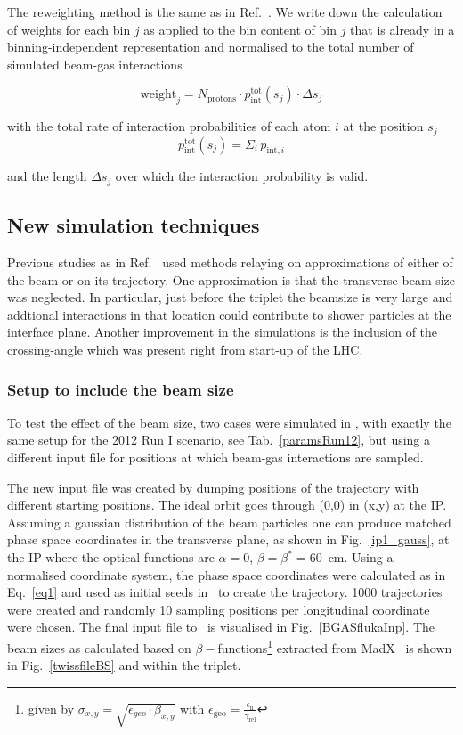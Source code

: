 The reweighting method is the same as in Ref.~\cite{nimPaperRod}. We write down the calculation of weights for each bin $j$ as applied to the bin content of bin $j$ that is already in a binning-independent representation and normalised to the total number of simulated beam-gas interactions 

\begin{equation} \label{eq3}
\mathrm{weight}_j = N_{\mathrm{protons}} \cdot p_{\mathrm{int}}^{\mathrm{tot}} (s_j) \cdot \Delta s_{j} 
\end{equation}

with the total rate of interaction probabilities of each atom $i$ at the position $s_j$ 
\begin{equation*} 
  p_{\mathrm{int}}^{\mathrm{tot}} (s_j) = \Sigma_i \, p_{\textrm{int},i}
\end{equation*}

and the length $\Delta s_{j}$ over which the interaction probability is valid.

\subsection{New simulation techniques}
Previous studies as in Ref.~\cite{nimPaperRod} used methods relaying on approximations of either of the beam or on its trajectory. One approximation is that the transverse beam size was neglected. In particular, just before the triplet the beamsize is very large and addtional interactions in that location could contribute to shower particles at the interface plane. Another improvement in the simulations is the inclusion of the crossing-angle which was present right from start-up of the LHC.

\subsubsection{Setup to include the beam size}
To test the effect of the beam size, two cases were simulated in \fluka, with exactly the same setup for the 2012 Run I scenario, see Tab.~\ref{paramsRun12}, but using a different input file for positions at which beam-gas interactions are sampled.

The new input file was created by dumping positions of the trajectory with different starting positions. The ideal orbit goes through (0,0) in (x,y) at the IP. Assuming a gaussian distribution of the beam particles one can produce matched phase space coordinates in the transverse plane, as shown in Fig.~\ref{ip1_gauss}, at the IP where the optical functions are $\alpha = 0$, $\beta = \beta^* = 60$~cm. Using a normalised coordinate system, the phase space coordinates were calculated as in Eq.~\ref{eq1} and used as initial seeds in \fluka~to create the trajectory. 1000 trajectories were created and randomly 10 sampling positions per longitudinal coordinate were chosen. The final input file to \fluka~is visualised in Fig.~\ref{BGASflukaInp}. The beam sizes as calculated based on $\beta-$functions\footnote{given by $\sigma_{x,y} = \sqrt{\epsilon_{geo} \cdot \beta_{x,y}}$ with $\epsilon_{\textrm{geo}} = \frac{ \epsilon_{\textrm{n}}}{\gamma_{\textrm{rel}}}$} extracted from MadX~\cite{madx} is shown in Fig.~\ref{twissfileBS} and within the triplet.


